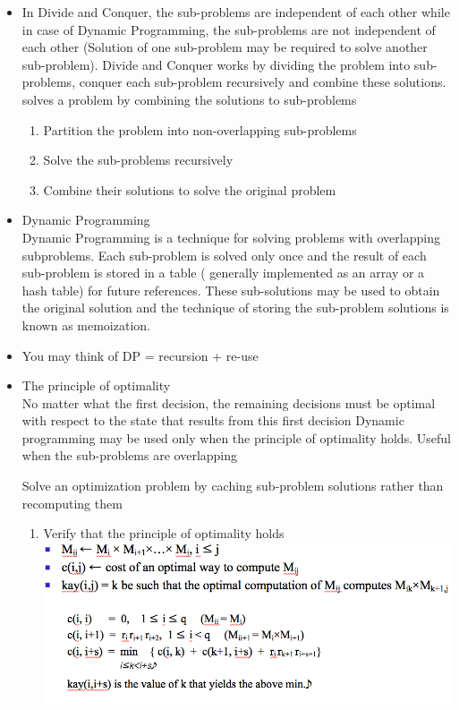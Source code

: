 \documentclass[a4paper,11pt,twoside]{book}
\begin{document}
\begin{itemize}
\item In Divide and Conquer, the sub-problems are independent of each other while in case of Dynamic Programming, the sub-problems are not independent of each other (Solution of one sub-problem may be required to solve another sub-problem). Divide and Conquer works by dividing the problem into sub-problems, conquer each sub-problem recursively and combine these solutions. solves a problem by combining the solutions to  sub-problems

\begin{enumerate}
\item Partition the problem into non-overlapping sub-problems
\item Solve the sub-problems recursively
\item Combine their solutions to solve the original problem
\end{enumerate}


\item Dynamic Programming \\

Dynamic Programming is a technique for solving problems with overlapping subproblems. Each sub-problem is solved only once and the result of each sub-problem is stored in a table ( generally implemented as an array or a hash table) for future references. These sub-solutions may be used to obtain the original solution and the technique of storing the sub-problem solutions is known as memoization.

\item You may think of DP = recursion + re-use


\item The principle of optimality \\
No matter what the first decision, the remaining decisions must be optimal with respect to the state that results from this first decision
Dynamic programming may be used only when the principle of optimality holds. Useful when the sub-problems are overlapping

Solve an optimization problem by caching  sub-problem solutions rather than recomputing them

\begin{enumerate}
\item Verify that the principle of optimality holds  \newline
\includegraphics[scale=0.45]{pics/Recurrence.png} \newline


\end{enumerate}
\end{itemize}
\end{document}
